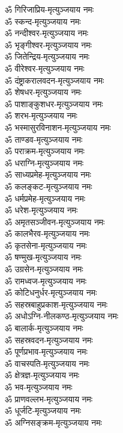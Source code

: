\begin{multicols}{2}
\begin{flushleft}
ॐ गिरिजाप्रिय-मृत्युञ्जयाय नमः\\
ॐ स्कन्द-मृत्युञ्जयाय नमः\\
ॐ नन्दीश्वर-मृत्युञ्जयाय नमः\hfill{}\\
ॐ भृङ्गीश्वर-मृत्युञ्जयाय नमः\\
ॐ जितेन्द्रिय-मृत्युञ्जयाय नमः\\
ॐ वीरेश्वर-मृत्युञ्जयाय नमः\\
ॐ दंष्ट्राकरालवदन-मृत्युञ्जयाय नमः\\
ॐ शेषधर-मृत्युञ्जयाय नमः\\
ॐ पाशाङ्कुशधर-मृत्युञ्जयाय नमः\\
ॐ शरभ-मृत्युञ्जयाय नमः\\
ॐ भस्मासुरविनाशन-मृत्युञ्जयाय नमः\\
ॐ ताण्डव-मृत्युञ्जयाय नमः\\
ॐ पराक्रम-मृत्युञ्जयाय नमः\hfill{}\\
ॐ धराग्नि-मृत्युञ्जयाय नमः\\
ॐ साध्यप्रमेह-मृत्युञ्जयाय नमः\\
ॐ कलङ्कट-मृत्युञ्जयाय नमः\\
ॐ धर्मप्रमेह-मृत्युञ्जयाय नमः\\
ॐ धरेश-मृत्युञ्जयाय नमः\\
ॐ अमृतसञ्जीवन-मृत्युञ्जयाय नमः\\
ॐ कालभैरव-मृत्युञ्जयाय नमः\\
ॐ कृतसेना-मृत्युञ्जयाय नमः\\
ॐ षण्मुख-मृत्युञ्जयाय नमः\\
ॐ उग्रसेन-मृत्युञ्जयाय नमः\hfill{}\\
ॐ रामध्वज-मृत्युञ्जयाय नमः\\
ॐ कोटिधनुर्धर-मृत्युञ्जयाय नमः\\
ॐ सहस्रबाहुप्रकाश-मृत्युञ्जयाय नमः\\
ॐ अधोऽग्नि-नीलकण्ठ-मृत्युञ्जयाय नमः\\
ॐ बालार्क-मृत्युञ्जयाय नमः\\
ॐ सहस्रवदन-मृत्युञ्जयाय नमः\\
ॐ पूर्णप्रभाव-मृत्युञ्जयाय नमः\\
ॐ वाचस्पति-मृत्युञ्जयाय नमः\\
ॐ क्षेत्रज्ञ-मृत्युञ्जयाय नमः\\
ॐ भव-मृत्युञ्जयाय नमः\hfill{}\\
ॐ प्राणवल्लभ-मृत्युञ्जयाय नमः\\
ॐ धूर्जटि-मृत्युञ्जयाय नमः\\
ॐ अग्निसङ्क्रम-मृत्युञ्जयाय नमः\\

\end{flushleft}
\end{multicols}

